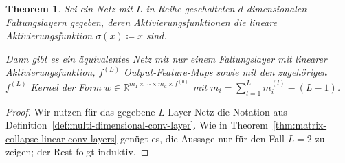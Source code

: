 \documentclass[paper=a4, 	%
		fontsize=11pt, 		%
		abstracton, 	%
		headsepline, 	%
		notitlepage	%
		]{scrartcl}
\newtheorem{theorem}{Theorem}[section]
\theoremstyle{definition}
\newcommand{\R}{\mathbb{R}}
\newcommand{\todo}[1]{{\color{red} #1}}
\begin{document}
\begin{theorem}
    Sei ein Netz mit $L$ in Reihe geschalteten $d$-dimensionalen Faltungslayern gegeben, deren Aktivierungsfunktionen die lineare Aktivierungsfunktion $\sigma(x) \coloneqq x$ sind.

    Dann gibt es ein äquivalentes Netz mit nur einem Faltungslayer mit linearer Aktivierungsfunktion, $f^{(L)}$ Output-Feature-Maps sowie mit den zugehörigen $f^{(L)}$ Kernel der Form $w\in\R^{m_1\times\cdots\times m_d \times f^{(0)}}$ mit $m_i=\sum_{l=1}^L m^{(l)}_i - (L-1)$.
\end{theorem}
\begin{proof}
    Wir nutzen für das gegebene $L$-Layer-Netz die Notation aus Definition~\ref{def:multi-dimensional-conv-layer}.
    Wie in Theorem~\ref{thm:matrix-collapse-linear-conv-layers} genügt es, die Aussage nur für den Fall $L=2$ zu zeigen; \todo{der Rest folgt induktiv.}


\end{proof}
\end{document}
